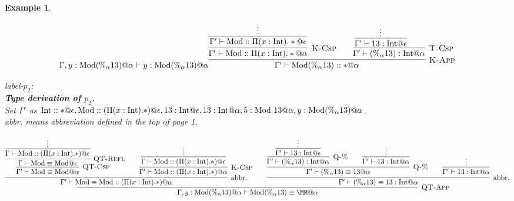 \documentclass[9pt, a4paper]{extarticle}
\theoremstyle{break}
\newtheorem{ex}{Example}
\newcommand{\G}{\Gamma}
\newcommand{\V}{\vdash}
\newcommand{\E}{\equiv}
\begin{document}
\begin{ex}
\begin{center}
$$        {\G,y:\M (\%_\alpha 13)@\alpha \V y:\M (\%_\alpha 13)@\alpha}
        {
            \infer[\textsc{K-App}]
            {\G' \V \M (\%_\alpha 13)::*@\alpha}
            {
                \infer[\textsc{K-Csp}]
                {\G'\V \M::\Pi (x:\I).*@\alpha}
                {
                    \infer[]
                    {\G'\V \M::\Pi (x:\I).*@\epsilon}
                    {\vdots}
                }
                \andalso
                \infer[\textsc{T-Csp}]
                {\G'\V (\%_\alpha 13):\I@\alpha}
                {
                    \infer[]
                    {\G'\V 13:\I@\epsilon}
                    {\vdots}
                    \andalso
                }
            }
        }
        $$
    \end{center}
    label-$p_2$:\\
    {\bf{Type derivation of $p_2$}.}\\
    Set $\G'$ as $\I::*@\epsilon,\M::(\Pi (x:\I).*)@\epsilon,13:\I@\epsilon,13:\I@\alpha,\bar{5}:\M\ 13@\alpha,y:\M (\%_\alpha 13)@\alpha$.\\
    abbr. means abbreviation defined in the top of page 1.
    \begin{center}
        $$
        \infer[\textsc{QT-App}]
        {\G,y:\M (\%_\alpha 13)@\alpha \V \M (\%_\alpha 13)\E\MM@\alpha}
        {
            \infer[\textrm{abbr.}]
            {\G' \V \M\E\M::(\Pi (x:\I).*)@\alpha}
            {
                \infer[\textsc{QT-Csp}]
                {\G' \V \M\E\M@\alpha}
                {
                    \infer[\textsc{QT-Refl}]
                    {\G\V \M\E\M@\epsilon}
                    {
                        \infer[]
                        {\G\V \M::(\Pi (x:\I).*)@\epsilon}
                        {
                            \vdots
                        }
                    }
                }
                \andalso
                \infer[\textsc{K-Csp}]
                {\G' \V \M::(\Pi (x:\I).*)@\alpha}
                {
                    \infer[]
                    {\G \V\M::(\Pi (x:\I).*)@\epsilon}
                    {\vdots}
                }
            }
            \andalso
            \infer[\textrm{abbr.}]
            {\G' \V (\%_\alpha 13)\E 13:\I@\alpha}
            {
                \infer[\textsc{Q-\%}]
                {\G' \V (\%_\alpha 13)\E 13@\alpha}
                {
                    \infer[\textsc{Q-\%}]
                    {\G' \V (\%_\alpha 13):\I@\alpha}
                    {
                        \infer[]
                        {\G' \V 13:\I@\epsilon}
                        {\vdots}
                    }
                    \andalso
                    \infer[]
                    {\G' \V 13:\I@\alpha}
                    {\vdots}
                }
                \andalso
                \infer[]
                {\G' \V 13:\I@\alpha}
                {\vdots}
            }
        }
        $$
    \end{center}
\end{ex}
\end{document}
